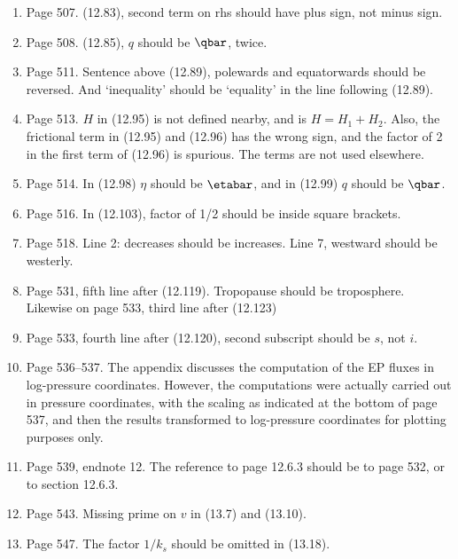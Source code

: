\documentclass[10pt]{article}
\begin{document}
\begin{enumerate}
\item Page 507. \Eq (12.83), second term on rhs should have plus sign, not minus sign.

\item Page 508. \Eq (12.85), $q$ should be $\qbar$, twice.

\item Page 511. Sentence above (12.89), polewards and equatorwards should be reversed. And `inequality' should be `equality' in the line following (12.89).

\item Page 513. $H$ in (12.95) is not defined nearby, and is $H = H_1 + H_2$. Also, the frictional term in (12.95) and (12.96) has the wrong sign, and the factor of 2 in the first term of (12.96) is spurious. The terms are not used elsewhere.

\item Page 514. In (12.98) $\eta$ should be $\etabar$, and in (12.99) $q$ should be $\qbar$.

\item Page 516. In (12.103), factor of 1/2 should be inside square brackets.

\item Page 518. Line 2: decreases should be increases. Line 7, westward should be westerly. 

\item Page 531, fifth line after (12.119). Tropopause should be troposphere. Likewise on page 533, third line after (12.123) 

\item Page 533, fourth line after (12.120), second subscript should be $s$, not $i$. 

\item Page 536--537. The appendix discusses the computation of the EP fluxes in log-pressure coordinates. However, the computations were actually carried out in pressure coordinates, with the scaling as indicated at the bottom of page 537, and then the results transformed to log-pressure coordinates for plotting purposes only. 

\item Page 539, endnote 12. The reference to page 12.6.3 should be to page 532, or to section 12.6.3.

\item Page 543. Missing prime on $v$ in (13.7) and (13.10).
 
\item Page 547. The factor $1/k_s$ should be omitted in (13.18).


\end{enumerate}
\end{document}
